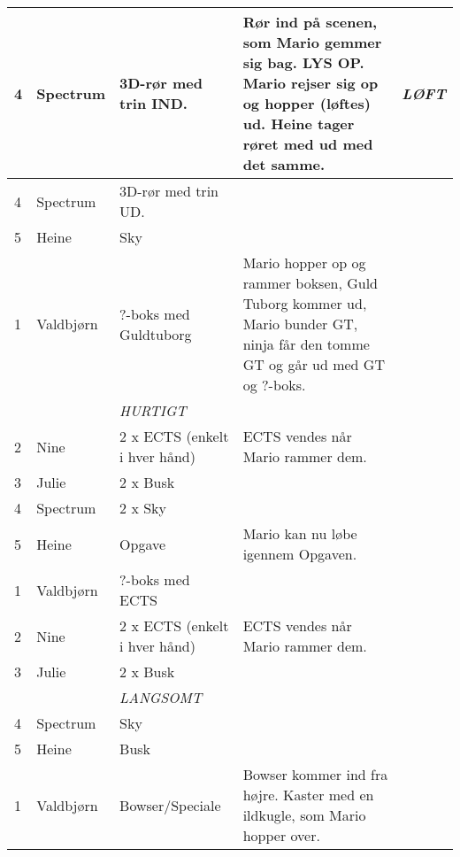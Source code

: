 \documentclass[a4paper,11pt]{article}
\begin{document}
\begin{sketch}
\begin{longtable}{|l||p{2cm}|p{3cm}|p{6.5cm}|p{1.3cm}|}
  4 & Spectrum & 3D-rør med trin IND. & Rør ind på scenen, som Mario gemmer sig bag. LYS OP. Mario rejser sig op og hopper (løftes) ud. Heine tager røret med ud med det samme. & \textit{LØFT} \\ \hline

  4 & Spectrum & 3D-rør med trin UD. & & \\ \hline

  5 & Heine & Sky & & \\ \hline

  1 & Valdbjørn & ?-boks med Guldtuborg & Mario hopper op og rammer boksen, Guld Tuborg kommer ud, Mario bunder GT, ninja får den tomme GT og går ud med GT og ?-boks. & \\ \hline

  \cellcolor[gray]{0.9} & \cellcolor[gray]{0.9} & \cellcolor[gray]{0.9} \textit{HURTIGT} & \cellcolor[gray]{0.9} & \cellcolor[gray]{0.9} \\ \hline

  2 & Nine & 2 x ECTS (enkelt i hver hånd)& ECTS vendes når Mario rammer dem. & \\ \hline

  3 & Julie & 2 x Busk & & \\ \hline

  4 & Spectrum & 2 x Sky & & \\ \hline

  5 & Heine & Opgave & Mario kan nu løbe igennem Opgaven. & \\ \hline

  1 & Valdbjørn & ?-boks med ECTS & & \\ \hline

  2 & Nine & 2 x ECTS (enkelt i hver hånd)& ECTS vendes når Mario rammer dem. & \\ \hline

  3 & Julie & 2 x Busk & & \\ \hline

  \cellcolor[gray]{0.9} & \cellcolor[gray]{0.9} & \cellcolor[gray]{0.9} \textit{LANGSOMT} & \cellcolor[gray]{0.9} & \cellcolor[gray]{0.9} \\ \hline

  4 & Spectrum & Sky & & \\ \hline

  5 & Heine & Busk & & \\ \hline

  1 & Valdbjørn & Bowser/Speciale & Bowser kommer ind fra højre. Kaster med en ildkugle, som Mario hopper over. & \\ \hline


\end{longtable}
\end{sketch}
\end{document}
